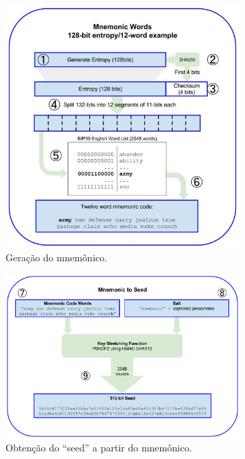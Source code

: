 \begin{figure}[ht]
\centering
\includegraphics[width=0.8\textwidth]{Cap1/bip39_to_mnemonic}
\caption{Geração do mnemônico.}
\label{bip39_to_mnemonic}
\end{figure}

\begin{figure}[ht]
\centering
\includegraphics[width=0.8\textwidth]{Cap1/bip39_to_seed}
\caption{Obtenção do ``seed'' a partir do mnemônico.}
\label{bip39_to_seed}
\end{figure}


